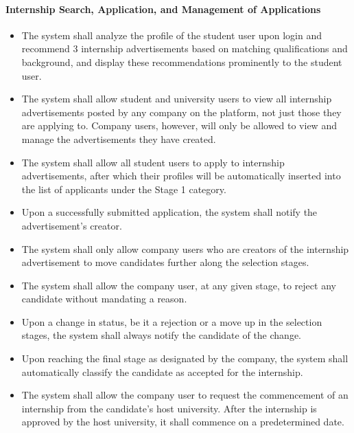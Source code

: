 \paragraph{Internship Search, Application, and Management of Applications}
\begin{itemize}[label={[\textbf{FR}]}, align=left, leftmargin=*]
    \item {} The system shall analyze the profile of the student user upon login and recommend 3 internship advertisements based on matching qualifications and background, and display these recommendations prominently to the student user.
    \item {} The system shall allow student and university users to view all internship advertisements posted by any company on the platform, not just those they are applying to. Company users, however, will only be allowed to view and manage the advertisements they have created.
    \item {} The system shall allow all student users to apply to internship advertisements, after which their profiles will be automatically inserted into the list of applicants under the Stage 1 category.
    \item {} Upon a successfully submitted application, the system shall notify the advertisement's creator.
    \item {} The system shall only allow company users who are creators of the internship advertisement to move candidates further along the selection stages.
    \item {} The system shall allow the company user, at any given stage, to reject any candidate without mandating a reason.
    \item {} Upon a change in status, be it a rejection or a move up in the selection stages, the system shall always notify the candidate of the change.
    \item {} Upon reaching the final stage as designated by the company, the system shall automatically classify the candidate as accepted for the internship.
    \item {} The system shall allow the company user to request the commencement of an internship from the candidate's host university. After the internship is approved by the host university, it shall commence on a predetermined date.
\end{itemize}

